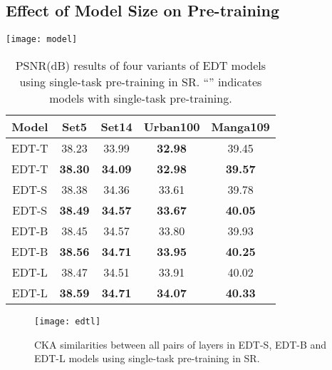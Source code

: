 \documentclass[runningheads]{llncs}
\begin{document}
	\subsection{Effect of Model Size on Pre-training}
	
	\begin{table}[t]
		\begin{minipage}[c]{0.49\linewidth}
			\centering
			\texttt{[image: model]}
			\label{fig:model}
		\end{minipage}\hfill
		\begin{minipage}[c]{0.49\linewidth}
			\centering
			\caption{PSNR(dB) results of four variants of EDT models using single-task pre-training in  SR. ``'' indicates models with single-task pre-training.}
			\renewcommand\arraystretch{1.2}
			\begin{tabular}{| c | c c c c |}
				\hline
				Model & Set5 & Set14 & Urban100 & Manga109 \\
				\hline
				EDT-T & 38.23 & 33.99 & \textbf{32.98} & 39.45 \\
				EDT-T & \textbf{38.30} & \textbf{34.09} & \textbf{32.98} & \textbf{39.57} \\		
				\hline
				EDT-S & 38.38 & 34.36 & 33.61 & 39.78 \\
				EDT-S & \textbf{38.49} & \textbf{34.57} & \textbf{33.67} & \textbf{40.05} \\
				\hline
				EDT-B & 38.45 & 34.57 & 33.80 & 39.93 \\
				EDT-B & \textbf{38.56} & \textbf{34.71} & \textbf{33.95} & \textbf{40.25 }\\
				\hline
				EDT-L & 38.47 & 34.51 & 33.91 & 40.02 \\
				EDT-L & \textbf{38.59} & \textbf{34.71} & \textbf{34.07} & \textbf{40.33} \\
				\hline
			\end{tabular}
			\vspace{0.05in}
			\label{tab:model}
		\end{minipage}
		\vspace{-0.2in}
	\end{table}
	




	\begin{figure}[t]
		\begin{center}
			\texttt{[image: edtl]}
		\end{center}
		\vspace{-0.15in}
		\caption{CKA similarities between all pairs of layers in EDT-S, EDT-B and EDT-L models using single-task pre-training in  SR.}
		\label{fig:edtl}
\end{figure}
	
\end{document}
